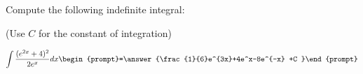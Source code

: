 \documentclass{ximera}
\author{Jim Talamo}
\begin{document}
\begin{exercise}
Compute the following indefinite integral:

\begin{prompt} (Use $C$ for the constant of integration) \end{prompt}
\[
\int \frac{(e^{2x}+4)^2}{2e^x}  dx 
\begin{prompt}=\answer{\frac{1}{6}e^{3x}+4e^x-8e^{-x} +C }\end{prompt}
\]
\end{exercise}
\end{document}
